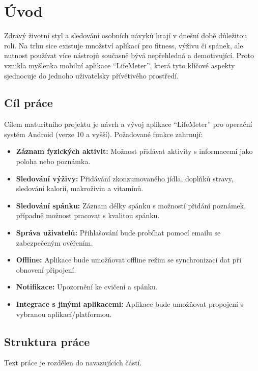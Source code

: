 \chapter*{Úvod}

Zdravý životní styl a sledování osobních návyků hrají v dnešní době důležitou roli. Na trhu sice existuje množství aplikací pro fitness, výživu či spánek, ale nutnost používat více nástrojů současně bývá nepřehledná a demotivující. Proto vznikla myšlenka mobilní aplikace \enquote{LifeMeter}, která tyto klíčové aspekty sjednocuje do jednoho uživatelsky přívětivého prostředí.

\section{Cíl práce}
Cílem maturitního projektu je návrh a vývoj aplikace \enquote{LifeMeter} pro operační systém Android (verze 10 a vyšší). Požadované funkce zahrnují:

\begin{itemize}
    \item \textbf{Záznam fyzických aktivit:} Možnost přidávat aktivity s informacemi jako poloha nebo poznámka.
    \item \textbf{Sledování výživy:} Přidávání zkonzumovaného jídla, doplňků stravy, sledování kalorií, makroživin a vitamínů.
    \item \textbf{Sledování spánku:} Záznam délky spánku s možností přidání poznámek, případně možnost pracovat s kvalitou spánku. 
    \item \textbf{Správa uživatelů:} Přihlašování bude probíhat pomocí emailu se zabezpečeným ověřením. 
    \item \textbf{Offline:} Aplikace bude umožňovat offline režim se synchronizací dat při obnovení připojení. 
    \item \textbf{Notifikace:} Upozornění ke cvičení a spánku.
    \item \textbf{Integrace s jinými aplikacemi:} Aplikace bude umožňovat propojení s vybranou aplikací/platformou.
\end{itemize}

\section{Struktura práce}
Text práce je rozdělen do navazujících částí. 
